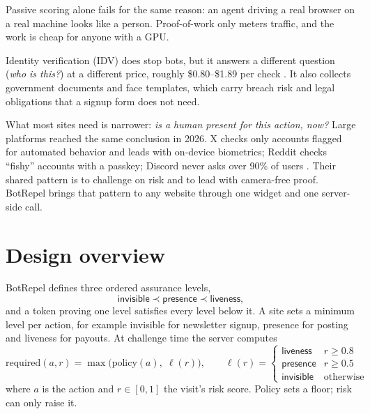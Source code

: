 \documentclass[11pt]{article}
\begin{document}
Passive scoring alone fails for the same reason: an agent driving a real browser on a real
machine looks like a person. Proof-of-work only meters traffic, and the work is cheap for anyone
with a GPU.

Identity verification (IDV) does stop bots, but it answers a different question (\emph{who is
this?}) at a different price, roughly \$0.80--\$1.89 per check \cite{pricing}. It also collects
government documents and face templates, which carry breach risk and legal obligations that a
signup form does not need.

What most sites need is narrower: \emph{is a human present for this action, now?} Large
platforms reached the same conclusion in 2026. X checks only accounts flagged for automated
behavior and leads with on-device biometrics; Reddit checks ``fishy'' accounts with a passkey;
Discord never asks over 90\% of users \cite{x-liveness,reddit,discord}. Their shared pattern is
to challenge on risk and to lead with camera-free proof. BotRepel brings that pattern to any
website through one widget and one server-side call.

\section{Design overview}


BotRepel defines three ordered assurance levels,
\[
  \textsf{invisible} \prec \textsf{presence} \prec \textsf{liveness},
\]
and a token proving one level satisfies every level below it. A site sets a minimum level per
action, for example \textsf{invisible} for newsletter signup, \textsf{presence} for posting and
\textsf{liveness} for payouts. At challenge time the server computes
\begin{equation}
  \text{required}(a, r) = \max\bigl(\text{policy}(a),\; \ell(r)\bigr),\qquad
  \ell(r) =
  \begin{cases}
    \textsf{liveness} & r \ge 0.8\\
    \textsf{presence} & r \ge 0.5\\
    \textsf{invisible} & \text{otherwise}
  \end{cases}
  \label{eq:required}
\end{equation}
where $a$ is the action and $r \in [0,1]$ the visit's risk score. Policy sets a floor; risk can
only raise it.
\end{document}
